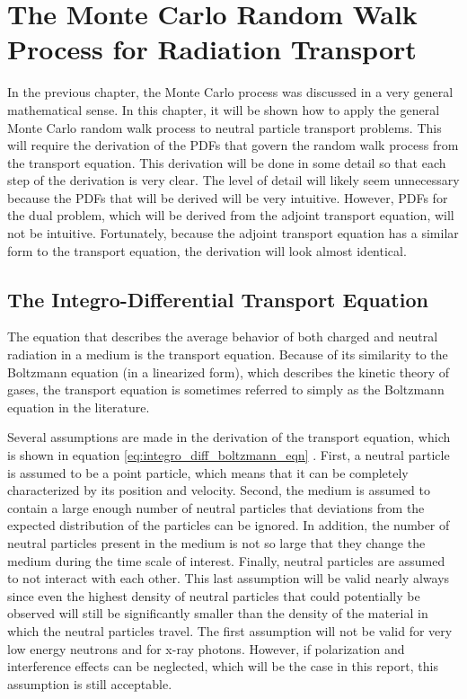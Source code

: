 \chapter{The Monte Carlo Random Walk Process for Radiation Transport}
\label{ch:particle_transport}
In the previous chapter, the Monte Carlo process was discussed in a very
general mathematical sense. In this chapter, it will be shown how to apply
the general Monte Carlo random walk process to neutral particle transport 
problems. This will require the derivation of the PDFs that govern the random 
walk process from the transport equation. This derivation will be done in
some detail so that each step of the derivation is very clear. The level of
detail will likely seem unnecessary because the PDFs that will be derived
will be very intuitive. However, PDFs for the dual problem, which will be
derived from the adjoint transport equation, will not be intuitive. 
Fortunately, because the adjoint transport equation has a similar form to the
transport equation, the derivation will look almost identical. 

\section{The Integro-Differential Transport Equation}
\label{sec:int_diff_transport_eqn}
The equation that describes the average behavior of both charged and neutral
radiation in a medium is the transport equation. Because of its similarity to 
the Boltzmann equation (in a linearized form), which describes the kinetic 
theory of gases, the transport equation is sometimes referred to simply as the 
Boltzmann equation in the literature. 

Several assumptions are made in the derivation of the transport 
equation, which is shown in equation \ref{eq:integro_diff_boltzmann_eqn} 
\citep{bell_nuclear_1979}. First, a neutral particle is assumed to be a point 
particle, which means that it can be completely characterized by its position 
and velocity. Second, the medium is assumed to contain a large enough number of 
neutral particles that deviations from the expected distribution of the 
particles can be ignored. In addition, the number of neutral particles 
present in the medium is not so large that they change the medium during the 
time scale of interest. Finally, neutral particles are assumed to not interact 
with each other. This last assumption will be valid nearly always since even 
the highest density of neutral particles that could potentially be observed 
will still be significantly smaller than the density of the material in which 
the neutral particles travel. The first assumption will not be valid for very 
low energy neutrons and for x-ray photons. However, if polarization and 
interference effects can be neglected, which will be the case in this report,
this assumption is still acceptable. 


